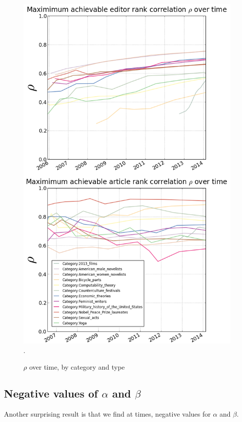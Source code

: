 \begin{figure}[!t]
\centering
\includegraphics[width=0.9\columnwidth]{rho_combined.png}.
\caption{$\rho$ over time, by category and type}
\label{fig:rhotime}
\end{figure}



\subsection{Negative values of $\alpha$ and $\beta$}
Another surprising result is that we find at times, negative values for $\alpha$ and $\beta$.


